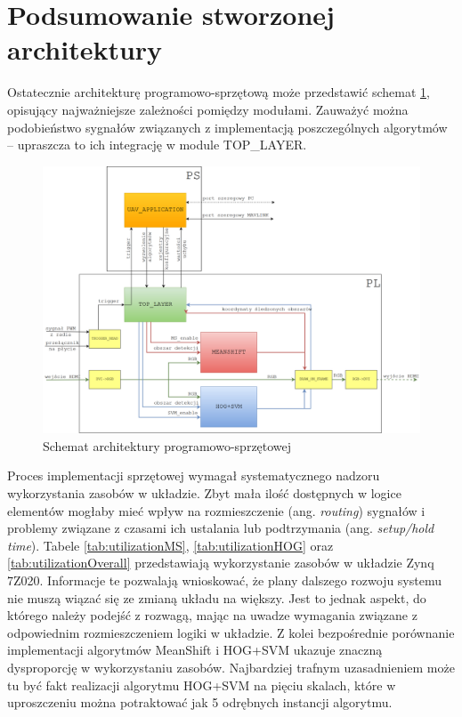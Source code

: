 \section{Podsumowanie stworzonej architektury}

Ostatecznie architekturę programowo-sprzętową może przedstawić schemat \ref{fig:5_top_scheme}, opisujący najważniejsze zależności pomiędzy modułami. 
Zauważyć można podobieństwo sygnałów związanych z implementacją poszczególnych algorytmów -- upraszcza to ich integrację w module TOP\_LAYER.

\begin{figure}[ht]
	\centering
	\includegraphics[width=16cm]{hardware_algorithm.png}
	\caption{Schemat architektury programowo-sprzętowej}
	\label{fig:5_top_scheme}
\end{figure}

Proces implementacji sprzętowej wymagał systematycznego nadzoru wykorzystania zasobów w układzie. %
Zbyt mała ilość dostępnych w logice elementów mogłaby mieć wpływ na rozmieszczenie (ang. \textit{routing}) sygnałów i problemy związane z czasami ich ustalania lub podtrzymania (ang. \textit{setup/hold time}). 
Tabele \ref{tab:utilizationMS}, \ref{tab:utilizationHOG} oraz \ref{tab:utilizationOverall} przedstawiają wykorzystanie zasobów w układzie Zynq 7Z020. Informacje te pozwalają wnioskować, że plany dalszego rozwoju systemu nie muszą wiązać się ze zmianą układu na większy. Jest to jednak aspekt, do którego należy podejść z rozwagą, mając na uwadze wymagania związane z odpowiednim rozmieszczeniem logiki w układzie. Z kolei bezpośrednie porównanie implementacji algorytmów MeanShift i HOG+SVM ukazuje znaczną dysproporcję w wykorzystaniu zasobów. Najbardziej trafnym uzasadnieniem może tu być fakt realizacji algorytmu HOG+SVM na pięciu skalach, które w uproszczeniu można potraktować jak 5 odrębnych instancji algorytmu.

